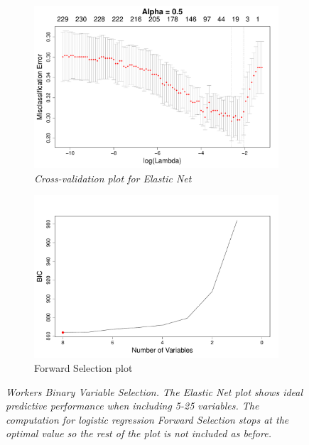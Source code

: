 \documentclass{article}
\begin{document}
\begin{figure}[h]
\begin{subfigure}[b]{0.5\textwidth}
\includegraphics[width=\textwidth]{elastic_cv_workers_binary.pdf}
\caption{\textsl{\small Cross-validation plot for Elastic Net}}
\end{subfigure}
\hfill
\begin{subfigure}[b]{0.5\textwidth}
\includegraphics[width=\textwidth]{forward_nvars_workers_binary.pdf}
\caption{Forward Selection plot}
\end{subfigure}
\caption{\textsl{\small Workers Binary Variable Selection. The Elastic Net plot shows ideal predictive performance when including 5-25 variables. The computation for logistic regression Forward Selection stops at the optimal value so the rest of the plot is not included as before.}}
\label{figure:workers_binary_opt}
\end{figure}
\end{document}
